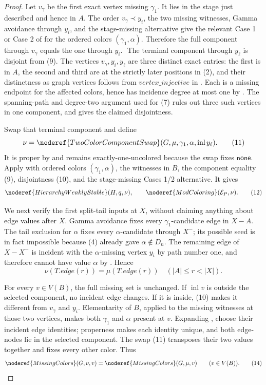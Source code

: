 \begin{proof}
Let \(v_\gamma\) be the first exact vertex missing \(\gamma_1\).  It lies
in the stage just described and hence in \(A\).  The order
\(v_\gamma\prec y_i\), the two missing witnesses, Gamma avoidance through
\(y_i\), and the stage-missing alternative give the relevant Case 1 or
Case 2 of  for the ordered colors
\((\gamma_1,\alpha)\).  Therefore the full component through
\(v_\gamma\) equals the one through \(y_i\).                       \(\tag{9}\)
The terminal component through \(y_\ell\) is disjoint from (9).
The vertices \(v_\gamma,y_i,y_\ell\) are three distinct exact entries:
the first is in \(A\), the second and third are at the strictly later
positions in (2), and their distinctness as graph vertices follows from
\(\mathit{vertex\_injective}\) in .  Each is a
missing endpoint for the affected colors, hence has incidence degree at
most one by .  The spanning-path
and degree-two argument used for (7) rules out three such vertices in one
component, and  gives the claimed
disjointness.                                                        \(\tag{10}\)

Swap that terminal component and define
\[
 \nu=\noderef{TwoColorComponentSwap}
       (G,\mu,\gamma_1,\alpha,\operatorname{inl}y_\ell).       \tag{11}
\]
It is proper by  and remains
exactly-one-uncolored because the swap fixes \(\mathsf{none}\).  Apply
 with ordered colors
\((\gamma_1,\alpha)\), the witnesses in \(B\), the component equality
(9), disjointness (10), and the stage-missing Cases 1/2 alternative.  It
gives
\[
 \noderef{HierarchyWeaklyStable}(H,q,\nu),\qquad
 \noderef{ModColoring}(\mathcal E_P,\nu).                    \tag{12}
\]

We next verify the first split-tail inputs at \(X\), without claiming
anything about edge values after \(X\).  Gamma avoidance fixes every
\(\gamma_1\)-candidate edge in \(X-A\).  The tail exclusion for
\(\alpha\) fixes every \(\alpha\)-candidate through \(X^-\); its possible
seed is in fact impossible because (4) already gave
\(\alpha\notin D_n\).  The remaining edge of \(X-X^-\) is incident with
the \(\alpha\)-missing vertex \(y_i\) by path number one, and therefore
cannot have value \(\alpha\) by .  Hence
\[
 \nu(T.\mathit{edge}(r))=\mu(T.\mathit{edge}(r))
                       \quad(|A|\le r<|X|).                   \tag{13}
\]

For every \(v\in V(B)\), the full missing set is unchanged.  If
\(\operatorname{inl}v\) is outside the selected component, no incident
edge changes.  If it is inside, (10) makes it different from
\(v_\gamma\) and \(y_i\).  Elementarity of \(B\), applied to the missing
witnesses at those two vertices, makes both \(\gamma_1\) and \(\alpha\)
present at \(v\).  Expanding , choose their
incident edge identities; properness makes each identity unique, and
both edge-nodes lie in the selected component.  The swap (11) transposes
their two values together and fixes every other color.  Thus
\[
 \noderef{MissingColors}(G,\nu,v)=
 \noderef{MissingColors}(G,\mu,v)\qquad(v\in V(B)).            \tag{14}
\]


\end{proof}
